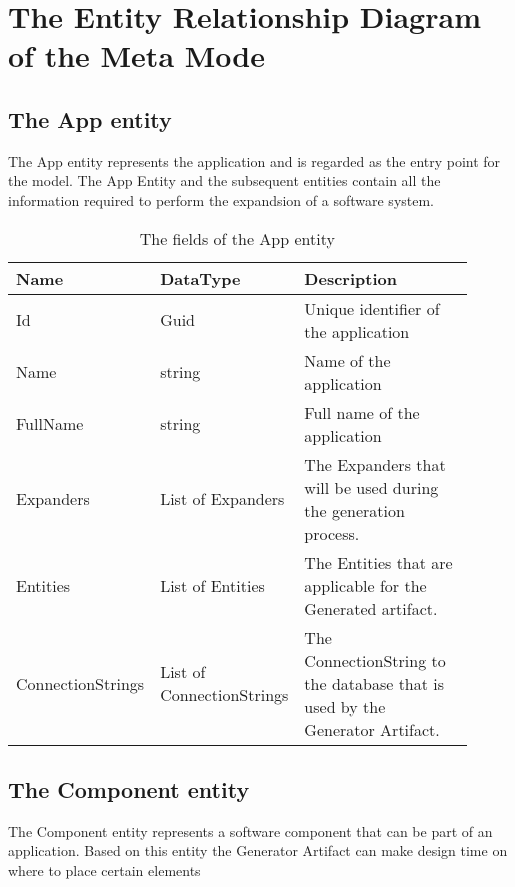 \chapter{The Entity Relationship Diagram of the Meta Mode} \label{appendix_metamodel_description}  

\section{The App entity}

The App entity represents the application and is regarded as the entry point for the
model. The App Entity and the subsequent entities contain all the information required to
perform the expandsion of a software system. 

\begin{table}[H]
    \small
    \begin{tabular}{ p{0.21\linewidth} p{0.21\linewidth} p{0.49\linewidth} }
        \hline
        \textbf{Name} & \textbf{DataType} & \textbf{Description} \\
        \hline
        Id & Guid & Unique identifier of the application \\
        Name & string & Name of the application \\
        FullName & string & Full name of the application \\
        Expanders & List of Expanders & The Expanders that will be used during the
        generation process. \\
        Entities & List of Entities & The Entities that are applicable for the Generated artifact. \\
        ConnectionStrings & List of ConnectionStrings & The ConnectionString to the
        database that is used by the Generator Artifact. \\
        \hline
    \end{tabular}
    \caption{The fields of the App entity}
    \label{table:app_entity}
\end{table}

\section{The Component entity}

The Component entity represents a software component that can be part of an application.
Based on this entity the Generator Artifact can make design time on where to place certain
elements  

